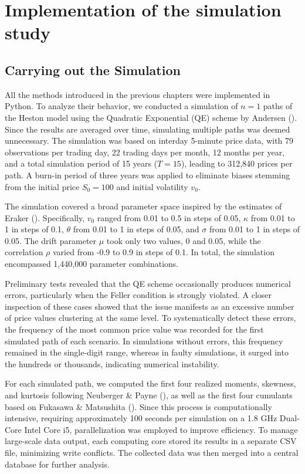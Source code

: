 \chapter{Implementation of the simulation study}
\label{sec:methodical_approach}

\section{Carrying out the Simulation}
All the methods introduced in the previous chapters were implemented in Python. To analyze their behavior, we conducted a simulation of $n = 1$ paths of the Heston model using the Quadratic Exponential (QE) scheme by Andersen (\citeyear{andersenEfficientSimulationHeston2007}). Since the results are averaged over time, simulating multiple paths was deemed unnecessary. The simulation was based on interday 5-minute price data, with 79 observations per trading day, 22 trading days per month, 12 months per year, and a total simulation period of 15 years ($T = 15$), leading to 312,840 prices per path. A burn-in period of three years was applied to eliminate biases stemming from the initial price $S_0 = 100$ and initial volatility $v_0$.

The simulation covered a broad parameter space inspired by the estimates of Eraker (\citeyear{erakerStockPricesVolatility2004}). Specifically, $v_0$ ranged from 0.01 to 0.5 in steps of 0.05, $\kappa$ from 0.01 to 1 in steps of 0.1, $\theta$ from 0.01 to 1 in steps of 0.05, and $\sigma$ from 0.01 to 1 in steps of 0.05. The drift parameter $\mu$ took only two values, 0 and 0.05, while the correlation $\rho$ varied from -0.9 to 0.9 in steps of 0.1. In total, the simulation encompassed 1,440,000 parameter combinations.

Preliminary tests revealed that the QE scheme occasionally produces numerical errors, particularly when the Feller condition is strongly violated. A closer inspection of these cases showed that the issue manifests as an excessive number of price values clustering at the same level. To systematically detect these errors, the frequency of the most common price value was recorded for the first simulated path of each scenario. In simulations without errors, this frequency remained in the single-digit range, whereas in faulty simulations, it surged into the hundreds or thousands, indicating numerical instability.

For each simulated path, we computed the first four realized moments, skewness, and kurtosis following Neuberger \& Payne (\citeyear{neubergerSkewnessStockMarket2021}), as well as the first four cumulants based on Fukasawa \& Matsushita (\citeyear{fukasawaRealizedCumulantsMartingales2021}). Since this process is computationally intensive, requiring approximately 100 seconds per simulation on a 1.8 GHz Dual-Core Intel Core i5, parallelization was employed to improve efficiency. To manage large-scale data output, each computing core stored its results in a separate CSV file, minimizing write conflicts. The collected data was then merged into a central database for further analysis.


